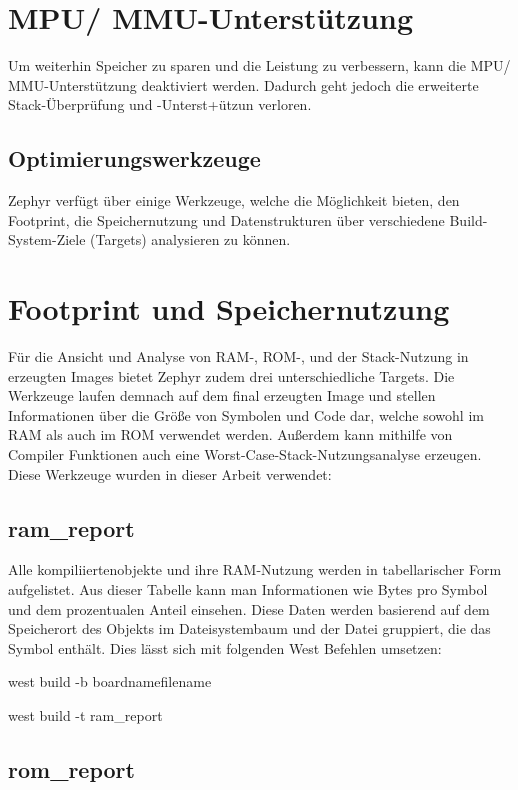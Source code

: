 \section{MPU/ MMU-Unterstützung}

Um weiterhin Speicher zu sparen und die Leistung zu verbessern, kann die MPU/ MMU-Unterstützung deaktiviert werden. Dadurch geht jedoch die erweiterte Stack-Überprüfung und -Unterst+ützun verloren.

\subsection{Optimierungswerkzeuge}

Zephyr verfügt über einige Werkzeuge, welche die Möglichkeit bieten, den Footprint, die Speichernutzung und Datenstrukturen über verschiedene Build-System-Ziele (Targets) analysieren zu können.

\section{Footprint und Speichernutzung}

Für die Ansicht und Analyse von RAM-, ROM-, und der Stack-Nutzung in erzeugten Images bietet Zephyr zudem drei unterschiedliche Targets. Die Werkzeuge laufen demnach auf dem final erzeugten Image und stellen Informationen über die Größe von Symbolen und Code dar, welche sowohl im RAM als auch im ROM verwendet werden. Außerdem kann mithilfe von Compiler Funktionen auch eine Worst-Case-Stack-Nutzungsanalyse erzeugen. Diese Werkzeuge wurden in dieser Arbeit verwendet:

\subsection{ram\_report}

Alle kompiliiertenobjekte und ihre RAM-Nutzung werden in tabellarischer Form aufgelistet. Aus dieser Tabelle kann man Informationen wie Bytes pro Symbol und dem prozentualen Anteil einsehen. Diese Daten werden basierend auf dem Speicherort des Objekts im Dateisystembaum und der Datei gruppiert, die das Symbol enthält. Dies lässt sich mit folgenden West Befehlen umsetzen:

west build -b boardnamefilename

west build -t ram\_report

\subsection{rom\_report}

